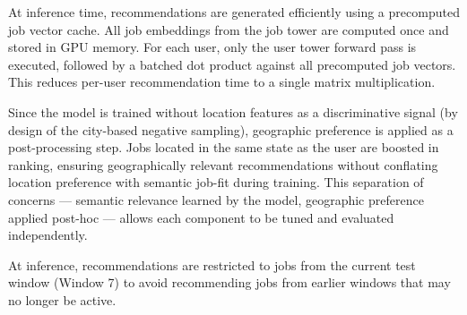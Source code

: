 At inference time, recommendations are generated efficiently using a precomputed job vector cache. All job embeddings from the job tower are computed once and stored in GPU memory. For each user, only the user tower forward pass is executed, followed by a batched dot product against all precomputed job vectors. This reduces per-user recommendation time to a single matrix multiplication.

Since the model is trained without location features as a discriminative signal (by design of the city-based negative sampling), geographic preference is applied as a post-processing step. Jobs located in the same state as the user are boosted in ranking, ensuring geographically relevant recommendations without conflating location preference with semantic job-fit during training. This separation of concerns — semantic relevance learned by the model, geographic preference applied post-hoc — allows each component to be tuned and evaluated independently.

At inference, recommendations are restricted to jobs from the current test window (Window 7) to avoid recommending jobs from earlier windows that may no longer be active.